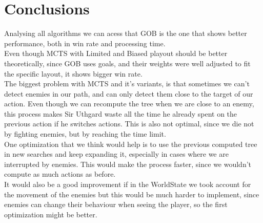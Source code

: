 \documentclass{article}
\begin{document}
  \section{Conclusions}
  Analysing all algorithms we can acess that GOB is the one that shows better performance, both in win rate and processing time.\\
  Even though MCTS with Limited and Biased playout should be better theoretically, since GOB uses goals, and their weights were well adjusted to fit the 
  specific layout, it shows bigger win rate.\\
  The biggest problem with MCTS and it's variants, is that sometimes we can't detect enemies in our path, and can only detect them close to the target of our action.
  Even though we can recompute the tree when we are close to an enemy, this process makes Sir Uthgard waste all the time he already spent on the previous action if he switches
  actions. This is also not optimal, since we die not by fighting enemies, but by reaching the time limit. \\
  One optimization that we think would help is to use the previous computed tree in new searches and keep expanding it, especially in cases where we are interrupted by enemies. 
  This would make the process faster, since we wouldn't compute as much actions as before.\\
  It would also be a good improvement if in the WorldState we took account for the movement of the enemies but this would be much harder to implement, since enemies can
  change their behaviour when seeing the player, so the first optimization might be better.
\end{document}
